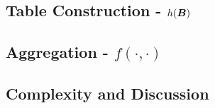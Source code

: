 \subsection{Table Construction - $h(\bm{B})$}

\subsection{Aggregation - $f(\cdot,\cdot)$}

\subsection{Complexity and Discussion}










